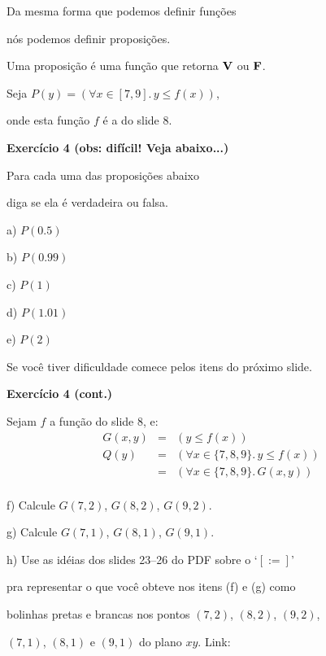 \documentclass[oneside,12pt]{article}
\begin{document}
Da mesma forma que podemos definir funções

nós podemos definir proposições.

Uma proposição é uma função que retorna $\mathbf{V}$ ou $\mathbf{F}$.

Seja $P(y) = (∀x∈[7,9]. \, y≤f(x))$,

onde esta função $f$ é a do slide 8.

\msk

{\bf Exercício 4 (obs: difícil! Veja abaixo...)}

Para cada uma das proposições abaixo

diga se ela é verdadeira ou falsa.

a) $P(0.5)$ 

b) $P(0.99)$ 

c) $P(1)$ 

d) $P(1.01)$ 

e) $P(2)$ 

\msk

Se você tiver dificuldade comece pelos itens do próximo slide.



\newpage


{\bf Exercício 4 (cont.)}

\ssk

Sejam $f$ a função do slide 8, e:
%
$$\begin{array}{rcl}
  G(x,y) &=& (y≤f(x)) \\
    Q(y) &=& (∀x∈\{7,8,9\}. \, y≤f(x)) \\
         &=& (∀x∈\{7,8,9\}. \, G(x,y)) \\
  \end{array}
$$

f) Calcule $G(7,2)$, $G(8,2)$, $G(9,2)$. 

g) Calcule $G(7,1)$, $G(8,1)$, $G(9,1)$. 

h) Use as idéias dos slides 23--26 do PDF sobre o `$[:=]$'

pra representar o que você obteve nos itens (f) e (g) como

bolinhas pretas e brancas nos pontos $(7,2)$, $(8,2)$, $(9,2)$,

$(7,1)$, $(8,1)$ e $(9,1)$ do plano $xy$. Link:

\msk
\end{document}
